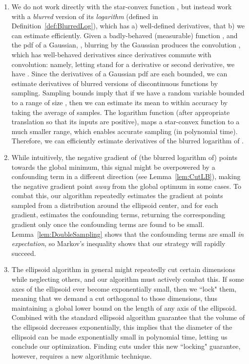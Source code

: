 \documentclass[11pt,letter]{article}
\numberwithin{nTheorems}{section}
\begin{document}
\begin{enumerate}
  \item We do not work directly with the star-convex function , but instead work with a \emph{blurred} version of its \emph{logarithm} (defined in Definition~\ref{def:BlurredLog}), which has a) well-defined derivatives, that b) we can estimate efficiently.
Given a badly-behaved (measurable) function , and the pdf of a Gaussian, , blurring  by the Gaussian produces the convolution , which has well-behaved derivatives since derivatives commute with convolution: namely, letting  stand for a derivative or second derivative, we have .
Since the derivatives of a Gaussian pdf  are each bounded, we can estimate derivatives of blurred versions of discontinuous functions by sampling.
Sampling bounds imply that if we have a random variable bounded to a range of size , then we can estimate its mean to within accuracy  by taking the average of  samples.
The logarithm function (after appropriate translation so that its inputs are positive), maps a star-convex function  to a much smaller range, which enables accurate sampling (in polynomial time).
Therefore, we can efficiently estimate derivatives of the blurred logarithm of .
  \item While intuitively, the negative gradient of (the blurred logarithm of)  points towards the global minimum, this signal might be overpowered by a confounding term in a different direction (see Lemma~\ref{lem:CutLB}), making the negative gradient point \emph{away} from the global optimum in some cases.
To combat this, our algorithm repeatedly estimates the gradient at points sampled from a distribution around the ellipsoid center, and for each gradient, estimates the confounding terms, returning the corresponding gradient only once the confounding terms are found to be small.
Lemma~\ref{lem:DoubleSampling} shows that the confounding terms are small \emph{in expectation}, so Markov's inequality shows that our strategy will rapidly succeed.
  \item The ellipsoid algorithm in general might repeatedly cut certain dimensions while neglecting others, and our algorithm must actively combat this.
If some axes of the ellipsoid ever become exponentially small, then we ``lock" them, meaning that we demand a cut orthogonal to those dimensions, thus maintaining a global lower bound on the length of any axis of the ellipsoid.
Combined with the standard ellipsoid algorithm guarantee that the volume of the ellipsoid decreases exponentially, this implies that the diameter of the ellipsoid can be made exponentially small in polynomial time, letting us conclude our optimization. Finding cuts under this new ``locking" guarantee, however, requires a new algorithmic technique.


\end{enumerate}
\end{document}
